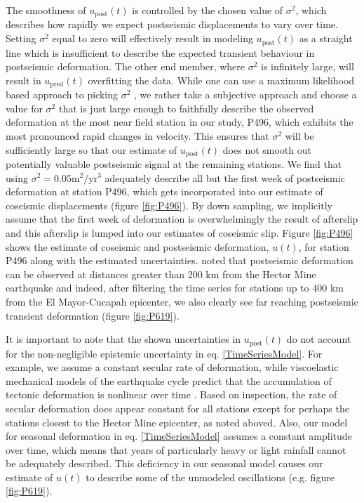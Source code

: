 \documentclass[1p]{elsarticle}
\begin{document}
The smoothness of $u_\mathrm{post}(t)$ is controlled by the chosen value of $\sigma^2$, which describes how rapidly we expect postseismic displacements to vary over time.  Setting $\sigma^2$ equal to zero will effectively result in modeling $u_\mathrm{post}(t)$ as a straight line which is insufficient to describe the expected transient behaviour in postseismic deformation. The other end member, where $\sigma^2$ is infinitely large, will result in $u_\mathrm{pred}(t)$ overfitting the data. While one can use a maximum likelihood based approach to picking $\sigma^2$ \citep[e.g.][]{Segall1997}, we rather take a subjective approach and choose a value for $\sigma^2$ that is just large enough to faithfully describe the observed deformation at the most near field station in our study, P496, which exhibits the most pronounced rapid changes in velocity. This ensures that $\sigma^2$ will be sufficiently large so that our estimate of $u_\mathrm{post}(t)$ does not smooth out potentially valuable postseismic signal at the remaining stations. We find that using $\sigma^2 = 0.05 \mathrm{m}^2 / \mathrm{yr}^3$ adequately describe all but the first week of postseismic deformation at station P496, which gets incorporated into our estimate of coseismic displacements (figure \ref{fig:P496}). By down sampling, we implicitly assume that the first week of deformation is overwhelmingly the result of afterslip and this afterslip is lumped into our estimates of coseismic slip.  Figure \ref{fig:P496} shows the estimate of coseismic and postseismic deformation, $u(t)$, for station P496 along with the estimated uncertainties. \cite{Freed2007a} noted that postseismic deformation can be observed at distances greater than 200 km from the Hector Mine earthquake and indeed, after filtering the time series for stations up to 400 km from the El Mayor-Cucapah epicenter, we also clearly see far reaching postseismic transient deformation (figure \ref{fig:P619}).      

It is important to note that the shown uncertainties in $u_\mathrm{post}(t)$ do not account for the non-negligible epistemic uncertainty in eq. \ref{TimeSeriesModel}.  For example, we assume a constant secular rate of deformation, while viscoelastic mechanical models of the earthquake cycle predict that the accumulation of tectonic deformation is nonlinear over time \citep{Thatcher1983}. Based on inspection, the rate of secular deformation does appear constant for all stations except for perhaps the stations closest to the Hector Mine epicenter, as noted aboved.  Also, our model for seasonal deformation in eq. \ref{TimeSeriesModel} assumes a constant amplitude over time, which means that years of particularly heavy or light rainfall cannot be adequately described.  This deficiency in our seasonal model causes our estimate of $u(t)$ to describe some of the unmodeled oscillations (e.g. figure \ref{fig:P619}).          
\end{document}
